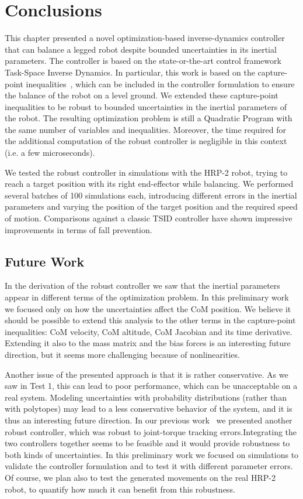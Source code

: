 
\section{Conclusions}
\label{sec:conclusions}
This chapter presented a novel optimization-based inverse-dynamics controller that can balance a legged robot despite bounded uncertainties in its inertial parameters. The controller is based on the state-or-the-art control framework Task-Space Inverse Dynamics. In particular, this work is based on the capture-point inequalities~\cite{Ramos2014a}, which can be included in the controller formulation to ensure the balance of the robot on a level ground. We extended these capture-point inequalities to be robust to bounded uncertainties in the inertial parameters of the robot. The resulting optimization problem is still a Quadratic Program with the same number of variables and inequalities. Moreover, the time required for the additional computation of the robust controller is negligible in this context (i.e. a few microseconds).

We tested the robust controller in simulations with the HRP-2 robot, trying to reach a target position with its right end-effector while balancing. We performed several batches of 100 simulations each, introducing different errors in the inertial parameters and varying the position of the target position and the required speed of motion. Comparisons against a classic TSID controller have shown impressive improvements in terms of fall prevention.

\subsection{Future Work}
In the derivation of the robust controller we saw that the inertial parameters appear in different terms of the optimization problem.
In this preliminary work we focused only on how the uncertainties affect the CoM position.
We believe it should be possible to extend this analysis to the other terms in the capture-point inequalities: CoM velocity, CoM altitude, CoM Jacobian and its time derivative. 
Extending it also to the mass matrix and the bias forces is an interesting future direction, but it seems more challenging because of nonlinearities.

Another issue of the presented approach is that it is rather conservative. As we saw in Test 1, this can lead to poor performance, which can be unacceptable on a real system. Modeling uncertainties with probability distributions (rather than with polytopes) may lead to a less conservative behavior of the system, and it is thus an interesting future direction. In our previous work~\cite{DelPrete2015b} we presented another robust controller, which was robust to joint-torque tracking errors.Integrating the two controllers together seems to be feasible and it would provide robustness to both kinds of uncertainties. In this preliminary work we focused on simulations to validate the controller formulation and to test it with different parameter errors. Of course, we plan also to test the generated movements on the real HRP-2 robot, to quantify how much it can benefit from this robustness.
